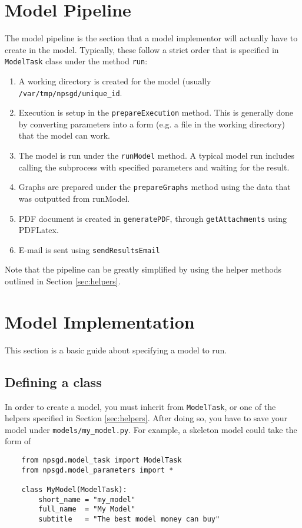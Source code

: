\documentclass{article}
\newcommand{\mpath}[1]{\texttt{#1}}
\newcommand{\mclass}[1]{\texttt{#1}}
\newcommand{\mmethod}[1]{\texttt{#1}}
\begin{document}
\section{Model Pipeline}
\label{sec:ModelPipeline}
The model pipeline is the section that a model implementor will actually have to
create in the model. Typically, these follow a strict order that is specified in
\mclass{ModelTask} class under the method \mmethod{run}:
\begin{enumerate}
    \item A working directory is created for the model (usually
    \mpath{/var/tmp/npsgd/unique\_id}. 
    \item Execution is setup in the \mmethod{prepareExecution} method. This is
    generally done by converting parameters into a form (e.g. a file in the
    working directory) that the model can work.
    \item The model is run under the \mmethod{runModel} method. A typical model
    run includes calling the subprocess with specified parameters and waiting
    for the result.
    \item Graphs are prepared under the \mmethod{prepareGraphs} method using the
    data that was outputted from runModel.
    \item PDF document is created in \mmethod{generatePDF}, through
    \mmethod{getAttachments} using PDFLatex. 
    \item E-mail is sent using \mmethod{sendResultsEmail}
\end{enumerate}

Note that the pipeline can be greatly simplified by using the helper methods
outlined in Section \ref{sec:helpers}.

\section{Model Implementation}
This section is a basic guide about specifying a model to run.

\subsection{Defining a class}
In order to create a model, you must inherit from \mclass{ModelTask}, or one of
the helpers specified in Section \ref{sec:helpers}. After doing so, you have to
save your model under \mpath{models/my\_model.py}. For example, a skeleton
model could take the form of
\begin{lstlisting}
    from npsgd.model_task import ModelTask
    from npsgd.model_parameters import *

    class MyModel(ModelTask):
        short_name = "my_model"
        full_name  = "My Model"
        subtitle   = "The best model money can buy"
\end{lstlisting}
\end{document}
